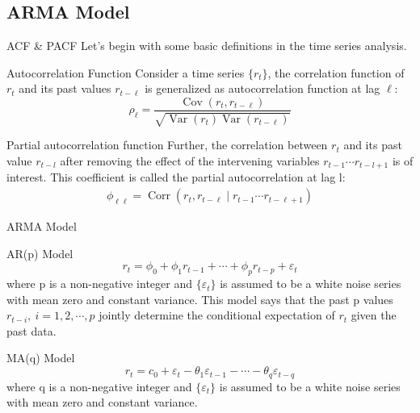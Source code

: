 \documentclass{beamer}
\begin{document}
\subsection{ARMA Model}
\begin{frame}{ACF \& PACF}
  Let's begin with some basic definitions in the time series analysis.
  \begin{block}{Autocorrelation Function}
    Consider a time series $\{r_t\}$, the correlation function of $r_t$ and its past values $r_{t-\ell}$ is generalized as autocorrelation function at lag $\ell$:
    \begin{displaymath}
      \rho_{\ell}=\frac{\operatorname{Cov}\left(r_{t}, r_{t-\ell}\right)}{\sqrt{\operatorname{Var}\left(r_{t}\right) \operatorname{Var}\left(r_{t-\ell}\right)}}
    \end{displaymath}
  \end{block}

  \begin{block}{Partial autocorrelation function}
    Further, the correlation between $r_t$ and its past value $r_{t-l}$ after removing the effect of the intervening variables $r_{t-1} \cdots r_{t-l+1}$ is of interest. This coefficient is called the partial autocorrelation at lag l:
    \begin{displaymath}
      \begin{array}{c}
        \phi_{\ell \ell}=\operatorname{Corr}\left(r_{t}, r_{t-\ell} \mid r_{t-1} \cdots r_{t-\ell + 1} \right)
      \end{array}
    \end{displaymath}
  \end{block}

\end{frame}


\begin{frame}{ARMA Model}
  \begin{block}{AR(p) Model}
    \begin{displaymath}
      r_{t}=\phi_{0}+\phi_{1}
      r_{t-1}+\cdots+\phi_{p}
      r_{t-p}+\varepsilon_{t}
    \end{displaymath}
    where p is a non-negative integer and $\{\varepsilon_{t}\}$ is assumed to be a white noise series with mean zero and constant variance. This model says that the past p values $r_{t-i},~ i=1,2, \cdots ,p$ jointly determine the conditional expectation of ${r_{t}}$ given the past data.
  \end{block}

  \begin{block}{MA(q) Model}
    \begin{displaymath}
      r_{t}=c_{0}+\varepsilon_{t}-\theta_{1} \varepsilon_{t-1}-\cdots-\theta_{q} \varepsilon_{t-q}
    \end{displaymath}
    where q is a non-negative integer and $\{\varepsilon_{t}\}$ is assumed to be a white noise series with mean zero and constant variance.
  \end{block}
\end{frame}
\end{document}
